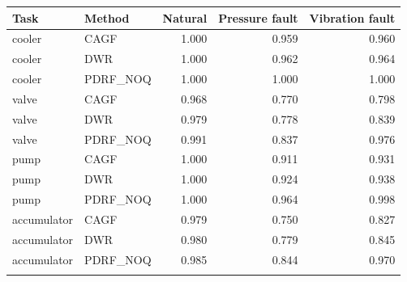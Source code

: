 \begin{tabular}{llrrr}
\toprule
Task & Method & Natural & Pressure fault & Vibration fault\\
\midrule
cooler & CAGF & 1.000 & 0.959 & 0.960\\
cooler & DWR & 1.000 & 0.962 & 0.964\\
cooler & PDRF\_NOQ & 1.000 & 1.000 & 1.000\\
\addlinespace
valve & CAGF & 0.968 & 0.770 & 0.798\\
valve & DWR & 0.979 & 0.778 & 0.839\\
valve & PDRF\_NOQ & 0.991 & 0.837 & 0.976\\
\addlinespace
pump & CAGF & 1.000 & 0.911 & 0.931\\
pump & DWR & 1.000 & 0.924 & 0.938\\
pump & PDRF\_NOQ & 1.000 & 0.964 & 0.998\\
\addlinespace
accumulator & CAGF & 0.979 & 0.750 & 0.827\\
accumulator & DWR & 0.980 & 0.779 & 0.845\\
accumulator & PDRF\_NOQ & 0.985 & 0.844 & 0.970\\
\addlinespace
\bottomrule
\end{tabular}
